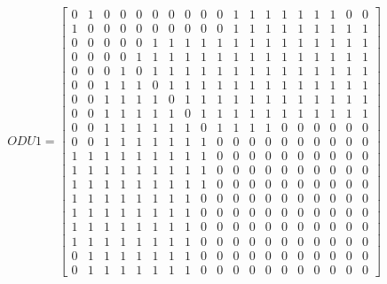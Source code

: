 \[
ODU1=
  \begin{bmatrix}
    0 & 1 & 0 & 0 & 0 & 0 & 0 & 0 & 0 & 0 & 1 & 1 & 1 & 1 & 1 & 1 & 1 & 0 & 0 \\
    1 & 0 & 0 & 0 & 0 & 0 & 0 & 0 & 0 & 0 & 1 & 1 & 1 & 1 & 1 & 1 & 1 & 1 & 1 \\
    0 & 0 & 0 & 0 & 0 & 1 & 1 & 1 & 1 & 1 & 1 & 1 & 1 & 1 & 1 & 1 & 1 & 1 & 1 \\
    0 & 0 & 0 & 0 & 1 & 1 & 1 & 1 & 1 & 1 & 1 & 1 & 1 & 1 & 1 & 1 & 1 & 1 & 1 \\
    0 & 0 & 0 & 1 & 0 & 1 & 1 & 1 & 1 & 1 & 1 & 1 & 1 & 1 & 1 & 1 & 1 & 1 & 1 \\
    0 & 0 & 1 & 1 & 1 & 0 & 1 & 1 & 1 & 1 & 1 & 1 & 1 & 1 & 1 & 1 & 1 & 1 & 1 \\
    0 & 0 & 1 & 1 & 1 & 1 & 0 & 1 & 1 & 1 & 1 & 1 & 1 & 1 & 1 & 1 & 1 & 1 & 1 \\
    0 & 0 & 1 & 1 & 1 & 1 & 1 & 0 & 1 & 1 & 1 & 1 & 1 & 1 & 1 & 1 & 1 & 1 & 1 \\
    0 & 0 & 1 & 1 & 1 & 1 & 1 & 1 & 0 & 1 & 1 & 1 & 1 & 0 & 0 & 0 & 0 & 0 & 0 \\
    0 & 0 & 1 & 1 & 1 & 1 & 1 & 1 & 1 & 0 & 0 & 0 & 0 & 0 & 0 & 0 & 0 & 0 & 0 \\
    1 & 1 & 1 & 1 & 1 & 1 & 1 & 1 & 1 & 0 & 0 & 0 & 0 & 0 & 0 & 0 & 0 & 0 & 0 \\
    1 & 1 & 1 & 1 & 1 & 1 & 1 & 1 & 1 & 0 & 0 & 0 & 0 & 0 & 0 & 0 & 0 & 0 & 0 \\
    1 & 1 & 1 & 1 & 1 & 1 & 1 & 1 & 1 & 0 & 0 & 0 & 0 & 0 & 0 & 0 & 0 & 0 & 0 \\
    1 & 1 & 1 & 1 & 1 & 1 & 1 & 1 & 0 & 0 & 0 & 0 & 0 & 0 & 0 & 0 & 0 & 0 & 0 \\
    1 & 1 & 1 & 1 & 1 & 1 & 1 & 1 & 0 & 0 & 0 & 0 & 0 & 0 & 0 & 0 & 0 & 0 & 0 \\
    1 & 1 & 1 & 1 & 1 & 1 & 1 & 1 & 0 & 0 & 0 & 0 & 0 & 0 & 0 & 0 & 0 & 0 & 0 \\
    1 & 1 & 1 & 1 & 1 & 1 & 1 & 1 & 0 & 0 & 0 & 0 & 0 & 0 & 0 & 0 & 0 & 0 & 0 \\
    0 & 1 & 1 & 1 & 1 & 1 & 1 & 1 & 0 & 0 & 0 & 0 & 0 & 0 & 0 & 0 & 0 & 0 & 0 \\
    0 & 1 & 1 & 1 & 1 & 1 & 1 & 1 & 0 & 0 & 0 & 0 & 0 & 0 & 0 & 0 & 0 & 0 & 0
  \end{bmatrix}
\]


